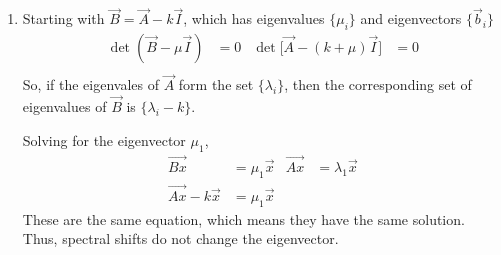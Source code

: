 \begin{enumerate}
    \item Starting with $ \vec{B} = \vec{A} - k \vec{I} $, which has eigenvalues
          $ \{\mu_i\} $ and eigenvectors $ \{\vec{b}_i\} $
          \begin{align}
              \det(\vec{B} - \mu \vec{I})              & = 0 &
              \det\Big[\vec{A} - (k + \mu)\vec{I}\Big] & = 0   \\
          \end{align}
          So, if the eigenvales of $ \vec{A} $ form the set $ \{\lambda_i\} $, then the
          corresponding set of eigenvalues of $ \vec{B} $ is $ \{\lambda_i - k\} $.
          \par Solving for the eigenvector $ \mu_1 $,
          \begin{align}
              \vec{Bx}            & = \mu_1 \vec{x}     &
              \vec{Ax}            & = \lambda_1 \vec{x}   \\
              \vec{Ax} - k\vec{x} & = \mu_1 \vec{x}
          \end{align}
          These are the same equation, which means they have the same solution. Thus,
          spectral shifts do not change the eigenvector.


\end{enumerate}
